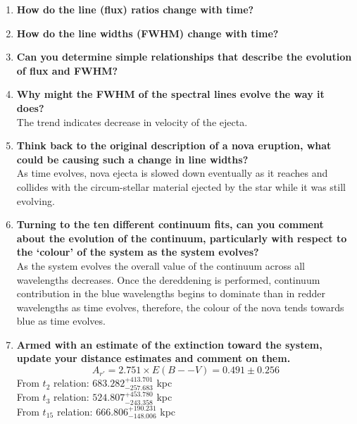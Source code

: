 \documentclass{article}
\begin{document}
\begin{enumerate}
		\item \textbf{How do the line (flux) ratios change with time?} \\

		\item \textbf{How do the line widths (FWHM) change with time?} \\

		\item \textbf{Can you determine simple relationships that describe the evolution of flux and FWHM?} \\

		\item \textbf{Why might the FWHM of the spectral lines evolve the way it does?} \\
		The trend indicates decrease in velocity of the ejecta.

		\item \textbf{Think back to the original description of a nova eruption, what could be causing such a change in line widths?} \\
		As time evolves, nova ejecta is slowed down eventually as it reaches and collides with the circum-stellar material ejected by the star while it was still evolving. 

		\item \textbf{Turning to the ten different continuum fits, can you comment about the evolution of the continuum, particularly with respect to the ‘colour’ of the system as the system evolves?} \\
		As the system evolves the overall value of the continuum across all wavelengths decreases. Once the dereddening is performed, continuum contribution in the blue wavelengths begins to dominate than in redder wavelengths as time evolves, therefore, the colour of the nova tends towards blue as time evolves.

		\item \textbf{Armed with an estimate of the extinction toward the system, update your distance estimates and comment on them.} \\
		\[A_{r'} = 2.751 \times E(B--V) = 0.491 \pm 0.256\]
		From \(t_2\) relation: \(683.282^{+413.701}_{-257.683}\) kpc \\

		From \(t_3\) relation: \(524.807^{+453.780}_{-243.358}\) kpc \\

		From \(t_{15}\) relation: \(666.806^{+190.231}_{-148.006}\) kpc \\


\end{enumerate}
\end{document}
